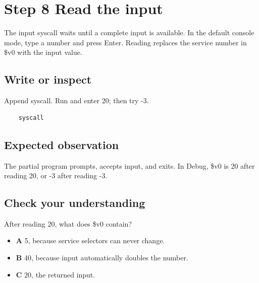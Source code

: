 \section{Step 8 Read the
  input}\label{001-console-calculation-s08-step-8-read-the-input}

The input syscall waits until a complete input is available. In the
default console mode, type a number and press Enter. Reading replaces
the service number in \$v0 with the input value.

\subsection{Write or
  inspect}\label{001-console-calculation-s08-write-or-inspect}

Append syscall. Run and enter 20; then try -3.

\begin{verbatim}
    syscall
\end{verbatim}

\subsection{Expected
  observation}\label{001-console-calculation-s08-expected-observation}

The partial program prompts, accepts input, and exits. In Debug, \$v0 is
20 after reading 20, or -3 after reading -3.

\subsection{Check your
  understanding}\label{001-console-calculation-s08-check-your-understanding}

After reading 20, what does \$v0 contain?

\begin{itemize}
  \tightlist
  \item
        \textbf{A} 5, because service selectors can never change.
  \item
        \textbf{B} 40, because input automatically doubles the number.
  \item
        \textbf{C} 20, the returned input.
\end{itemize}
